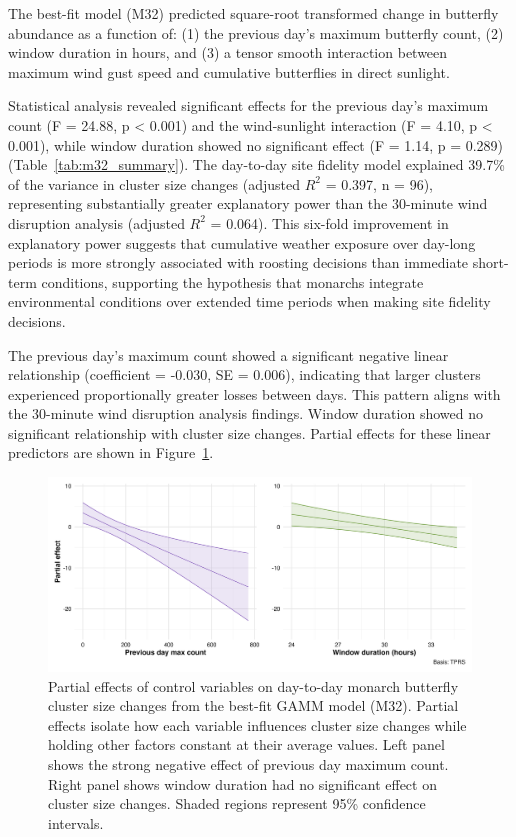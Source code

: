 The best-fit model (M32) predicted square-root transformed change in butterfly abundance as a function of: (1) the previous day's maximum butterfly count, (2) window duration in hours, and (3) a tensor smooth interaction between maximum wind gust speed and cumulative butterflies in direct sunlight.

Statistical analysis revealed significant effects for the previous day's maximum count (F = 24.88, p < 0.001) and the wind-sunlight interaction (F = 4.10, p < 0.001), while window duration showed no significant effect (F = 1.14, p = 0.289) (Table~\ref{tab:m32_summary}). The day-to-day site fidelity model explained 39.7\% of the variance in cluster size changes (adjusted $R^2$ = 0.397, n = 96), representing substantially greater explanatory power than the 30-minute wind disruption analysis (adjusted $R^2$ = 0.064). This six-fold improvement in explanatory power suggests that cumulative weather exposure over day-long periods is more strongly associated with roosting decisions than immediate short-term conditions, supporting the hypothesis that monarchs integrate environmental conditions over extended time periods when making site fidelity decisions.



The previous day's maximum count showed a significant negative linear relationship (coefficient = -0.030, SE = 0.006), indicating that larger clusters experienced proportionally greater losses between days. This pattern aligns with the 30-minute wind disruption analysis findings. Window duration showed no significant relationship with cluster size changes. Partial effects for these linear predictors are shown in Figure~\ref{fig:partial_effects_sunset}.

\begin{figure}[htbp]
    \centering
    \includegraphics[width=\textwidth]{supplemental/results/sunset/figures/partial_effects_best_1x2.png}
    \caption{Partial effects of control variables on day-to-day monarch butterfly cluster size changes from the best-fit GAMM model (M32). Partial effects isolate how each variable influences cluster size changes while holding other factors constant at their average values. Left panel shows the strong negative effect of previous day maximum count. Right panel shows window duration had no significant effect on cluster size changes. Shaded regions represent 95\% confidence intervals.}
    \label{fig:partial_effects_sunset}
\end{figure}

